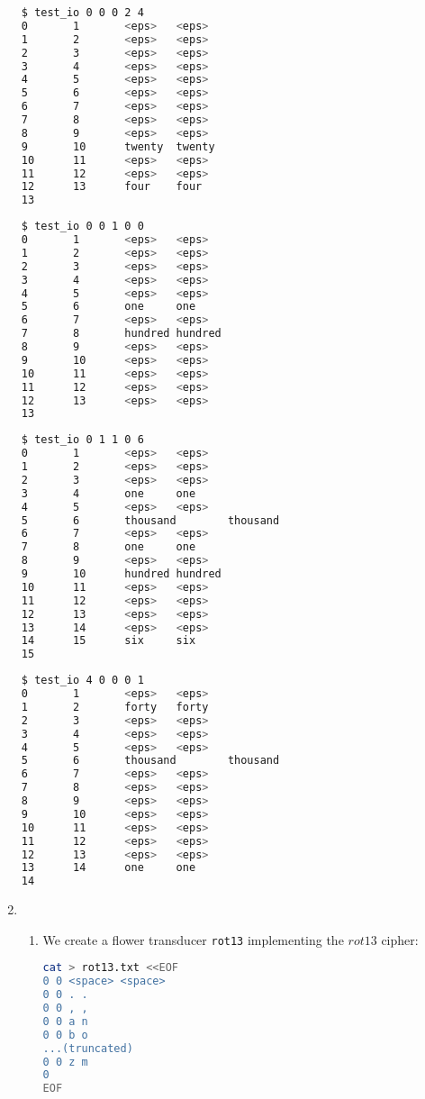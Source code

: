\documentclass[a4paper,oneside,reqno]{amsart}
\begin{document}
\begin{enumerate}[label=\arabic*.]
    \begin{lstlisting}[language=bash]
$ test_io 0 0 0 2 4
0       1       <eps>   <eps>
1       2       <eps>   <eps>
2       3       <eps>   <eps>
3       4       <eps>   <eps>
4       5       <eps>   <eps>
5       6       <eps>   <eps>
6       7       <eps>   <eps>
7       8       <eps>   <eps>
8       9       <eps>   <eps>
9       10      twenty  twenty
10      11      <eps>   <eps>
11      12      <eps>   <eps>
12      13      four    four
13
    \end{lstlisting}
    \begin{lstlisting}[language=bash]
$ test_io 0 0 1 0 0
0       1       <eps>   <eps>
1       2       <eps>   <eps>
2       3       <eps>   <eps>
3       4       <eps>   <eps>
4       5       <eps>   <eps>
5       6       one     one
6       7       <eps>   <eps>
7       8       hundred hundred
8       9       <eps>   <eps>
9       10      <eps>   <eps>
10      11      <eps>   <eps>
11      12      <eps>   <eps>
12      13      <eps>   <eps>
13
    \end{lstlisting}
    \begin{lstlisting}[language=bash]
$ test_io 0 1 1 0 6
0       1       <eps>   <eps>
1       2       <eps>   <eps>
2       3       <eps>   <eps>
3       4       one     one
4       5       <eps>   <eps>
5       6       thousand        thousand
6       7       <eps>   <eps>
7       8       one     one
8       9       <eps>   <eps>
9       10      hundred hundred
10      11      <eps>   <eps>
11      12      <eps>   <eps>
12      13      <eps>   <eps>
13      14      <eps>   <eps>
14      15      six     six
15
    \end{lstlisting}
    \begin{lstlisting}[language=bash]
$ test_io 4 0 0 0 1
0       1       <eps>   <eps>
1       2       forty   forty
2       3       <eps>   <eps>
3       4       <eps>   <eps>
4       5       <eps>   <eps>
5       6       thousand        thousand
6       7       <eps>   <eps>
7       8       <eps>   <eps>
8       9       <eps>   <eps>
9       10      <eps>   <eps>
10      11      <eps>   <eps>
11      12      <eps>   <eps>
12      13      <eps>   <eps>
13      14      one     one
14
    \end{lstlisting}

  \item
    \begin{enumerate}[label=(\alph*)]
      \item We create a flower transducer \texttt{rot13} implementing the $rot13$ cipher:
        \begin{lstlisting}[language=bash]
cat > rot13.txt <<EOF
0 0 <space> <space>
0 0 . .
0 0 , ,
0 0 a n
0 0 b o
...(truncated)
0 0 z m
0
EOF
        \end{lstlisting}


\end{enumerate}
\end{enumerate}
\end{document}
